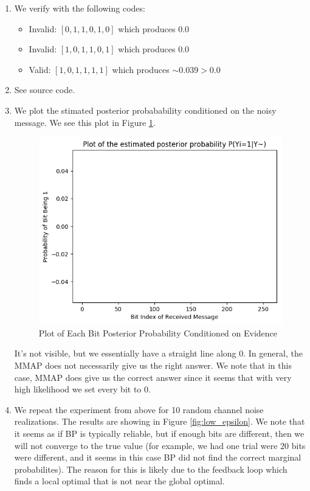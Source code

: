 \documentclass[12pt]{article}
\begin{document}
\begin{enumerate}[label=(\alph*)]
\item We verify with the following codes:
	\begin{itemize}
		\item Invalid: $[0, 1, 1, 0, 1, 0]$ which produces $0.0$
    \item Invalid: $[1, 0, 1, 1, 0, 1]$ which produces $0.0$
    \item Valid: $[1, 0, 1, 1, 1, 1]$ which produces $\sim0.039 > 0.0$
	\end{itemize}
\item See source code.
\item We plot the stimated posterior probabability conditioned on the noisy message. We see this plot in Figure \ref{fig:conditional_probability_message}.

\begin{figure}[!h]
\centering
\includegraphics{programming/5c}
\caption{Plot of Each Bit Posterior Probability Conditioned on Evidence}
\label{fig:conditional_probability_message}
\end{figure}

It's not visible, but we essentially have a straight line along $0$. In general, the MMAP does not necessarily give us the right answer. We note that in this case, MMAP does give us the correct answer since it seems that with very high likelihood we set every bit to $0$.

\item We repeat the experiment from above for 10 random channel noise realizations. The results are showing in Figure \ref{fig:low_epsilon}. We note that it seems as if BP is typically reliable, but if enough bits are different, then we will not converge to the true value (for example, we had one trial were $20$ bits were different, and it seems in this case BP did not find the correct marginal probabilites). The reason for this is likely due to the feedback loop which finds a local optimal that is not near the global optimal.


\end{enumerate}
\end{document}

